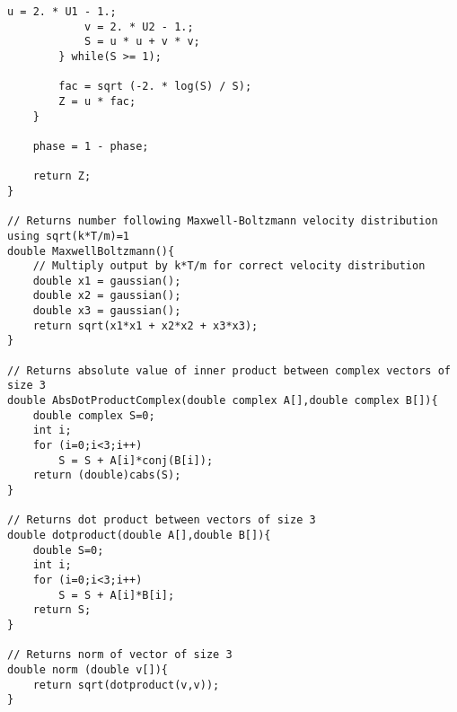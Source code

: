 \begin{lstlisting}[style=CStyle]
            u = 2. * U1 - 1.;
            v = 2. * U2 - 1.;
            S = u * u + v * v;
        } while(S >= 1);

        fac = sqrt (-2. * log(S) / S);
        Z = u * fac;
    }

    phase = 1 - phase;

    return Z;
}

// Returns number following Maxwell-Boltzmann velocity distribution using sqrt(k*T/m)=1
double MaxwellBoltzmann(){
    // Multiply output by k*T/m for correct velocity distribution
    double x1 = gaussian();
    double x2 = gaussian();
    double x3 = gaussian();
    return sqrt(x1*x1 + x2*x2 + x3*x3);
}

// Returns absolute value of inner product between complex vectors of size 3
double AbsDotProductComplex(double complex A[],double complex B[]){
    double complex S=0;
    int i;
    for (i=0;i<3;i++)
        S = S + A[i]*conj(B[i]);
    return (double)cabs(S);
}

// Returns dot product between vectors of size 3
double dotproduct(double A[],double B[]){
    double S=0;
    int i;
    for (i=0;i<3;i++)
        S = S + A[i]*B[i];
    return S;
}

// Returns norm of vector of size 3
double norm (double v[]){
    return sqrt(dotproduct(v,v));
}
\end{lstlisting}